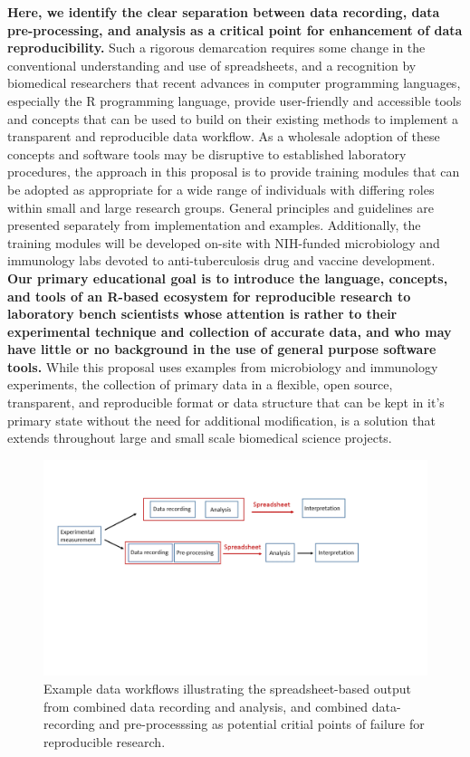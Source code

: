 \documentclass[pdftex,english,11pt,parskip=half]{scrartcl}
\begin{document}
\textbf{Here, we identify the clear separation between data recording, data pre-processing, and
analysis as a critical point for enhancement of data reproducibility.} Such a rigorous demarcation 
requires some change in the conventional understanding and use of spreadsheets, and a recognition by 
biomedical researchers that recent advances in computer programming languages, especially the 
R programming language, provide user-friendly and accessible tools and concepts that can be 
used to build on their existing methods to implement a transparent and reproducible data workflow. 
As a wholesale adoption of these concepts and software tools may be disruptive to established 
laboratory procedures, the 
approach in this proposal is to provide training modules that can be adopted as appropriate 
for a wide range of individuals with differing roles within small and large research groups.  
General principles and guidelines are presented separately from implementation and examples. 
Additionally, the training modules will be developed on-site with NIH-funded microbiology 
and immunology labs devoted to anti-tuberculosis drug and vaccine development. 
\textbf{Our primary educational goal is to introduce the language, concepts, and tools of an R-based 
ecosystem for reproducible research to laboratory bench scientists whose attention is rather to 
their experimental technique and collection of accurate data, and who may have little or no background 
in the use of general purpose software tools.} While this proposal uses examples from microbiology 
and immunology experiments, the collection of primary data in a flexible, open source, 
transparent, and reproducible format or data structure that can be kept in it's primary state 
without the need for additional modification, is a solution that extends throughout large and 
small scale biomedical science projects. 

\begin{figure}[ht] \includegraphics[width =
\textwidth, trim={0 9cm 0 3cm}, clip]{figures/workflow.png} 
\caption{Example data workflows illustrating the spreadsheet-based output from
combined data recording and analysis, and combined data-recording and pre-processsing as potential
critial points of failure for reproducible research.} 
\label{fig:workflow} \end{figure}
\end{document}
